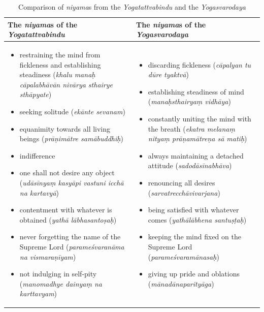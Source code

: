 \begin{table}[H]
  \footnotesize
\centering
\begin{tabular}{|m{5cm}|m{5cm}|}
\hline
\textbf{The \textit{niyama}s of the \textit{Yogatattvabindu}} & \textbf{The \textit{niyama}s of the \textit{Yogasvarodaya}} \\
\hline
\begin{itemize}
\item restraining the mind from fickleness and establishing steadiness (\textit{khalu manaḥ cāpalabhāvān nivārya sthairye sthāpyate})
\item seeking solitude (\textit{ekānte sevanam})
\item equanimity towards all living beings (\textit{prāṇimātre samābuddhiḥ})
\item indifference
\item one shall not desire any object (\textit{udāsīnyaṃ kasyāpi vastuni icchā na kartavyā})
\item contentment with whatever is obtained (\textit{yathā lābhasantoṣaḥ})
\item never forgetting the name of the Supreme Lord (\textit{parameśvaranāma na vismaraṇīyam})
\item not indulging in self-pity (\textit{manomadhye dainyaṃ na karttavyam})
\end{itemize}
&
\begin{itemize}
\item discarding fickleness (\textit{cāpalyan tu dūre tyaktvā})
\item establishing steadiness of mind (\textit{manaḥsthairyaṃ vidhāya})
\item constantly uniting the mind with the breath (\textit{ekatra melanaṃ nityaṃ prāṇamātreṇa sā matiḥ})
\item always maintaining a detached attitude (\textit{sadodāsīnabhāva})
\item renouncing all desires (\textit{sarvatrecchāvivarjana})
\item being satisfied with whatever comes (\textit{yathālābhena santuṣṭaḥ})
\item keeping the mind fixed on the Supreme Lord (\textit{parameśvaramānasaḥ})
\item giving up pride and oblations (\textit{mānadānaparityāga})
\end{itemize}
\\
\hline
\end{tabular}
\caption{Comparison of \textit{niyama}s from the \emph{Yogatattvabindu} and the \emph{Yogasvarodaya}}
\normalsize
\end{table}
\normalsize

